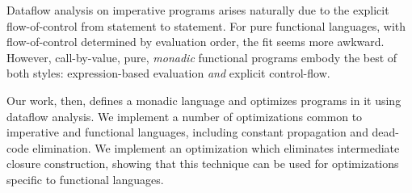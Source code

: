 Dataflow analysis on imperative programs arises naturally due to the
explicit flow-of-control from statement to statement. For pure
functional languages, with flow-of-control determined by evaluation
order, the fit seems more awkward. However, call-by-value, pure,
\emph{monadic} functional programs embody the best of both
styles: expression-based evaluation \emph{and} explicit
control-flow. 

Our work, then, defines a monadic language and optimizes programs in
it using dataflow analysis. We implement a number of optimizations
common to imperative and functional languages, including constant
propagation and dead-code elimination. We implement an optimization
which eliminates intermediate closure construction, showing that this
technique can be used for optimizations specific to functional
languages.



